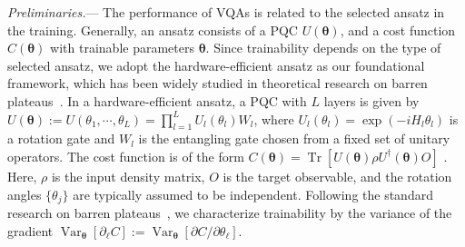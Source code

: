 \documentclass[%
 reprint,
 superscriptaddress,
 amsmath,amssymb,
 aps, prl, twocolumn, showpacs,
]{revtex4-2}
\begin{document}

\emph{\label{sec:2} Preliminaries.}---
The performance of VQAs is related to the selected ansatz in the training. Generally, an ansatz consists of a PQC $U(\boldsymbol\theta)$, and a cost function $C(\boldsymbol\theta)$ with trainable parameters $\boldsymbol\theta$. Since trainability depends on the type of selected ansatz, we adopt the hardware-efficient ansatz as our foundational framework, which has been widely studied in theoretical research on barren plateaus~\cite{tilly2022variational, kandala2017hardware, wiersema2020exploring, wecker2015progress}. In a hardware-efficient ansatz, a PQC with $L$ layers is given by
    $U(\boldsymbol\theta):= U(\theta_1, \cdots, \theta_L) = \prod_{l=1}^LU_l(\theta_l)W_l$,
where  $U_l(\theta_l) = \exp(-iH_{l}\theta_{l})$ is a rotation gate and $W_l$ is the entangling gate chosen from a fixed set of unitary operators. The cost function is of the form $C(\boldsymbol{\theta}) = \operatorname{Tr}[U(\boldsymbol\theta)\rho U^\dagger(\boldsymbol\theta)O]$ .
Here, $\rho$ is the input density matrix, $O$ is the target observable, and the rotation angles $\{\theta_j\}$ are typically assumed to be independent.
Following the standard research on barren plateaus~\cite{mcclean2018barren, holmes2022connecting}, we characterize trainability by the variance of the gradient $\operatorname{Var}_{\boldsymbol\theta}[\partial_\ell C]:=\operatorname{Var}_{\boldsymbol\theta}[\partial C/\partial\theta_\ell]$. 
\end{document}
